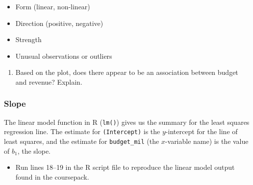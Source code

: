 \documentclass[
]{report}
\providecommand{\tightlist}{%
  \setlength{\itemsep}{0pt}\setlength{\parskip}{0pt}}
\begin{document}
\begin{itemize}
\tightlist
\item
  Form (linear, non-linear)
\end{itemize}

\vspace{.075in}

\begin{itemize}
\tightlist
\item
  Direction (positive, negative)
\end{itemize}

\vspace{.075in}

\begin{itemize}
\tightlist
\item
  Strength
\end{itemize}

\vspace{.075in}

\begin{itemize}
\tightlist
\item
  Unusual observations or outliers
\end{itemize}

\vspace{.075in}

\begin{enumerate}
\def\labelenumi{\arabic{enumi}.}
\setcounter{enumi}{2}
\tightlist
\item
  Based on the plot, does there appear to be an association between budget and revenue? Explain.
\end{enumerate}

\vspace{1in}

\hypertarget{slope}{%
\subsubsection*{Slope}\label{slope}}

The linear model function in R (\texttt{lm()}) gives us the summary for the least squares regression line. The estimate for \texttt{(Intercept)} is the \(y\)-intercept for the line of least squares, and the estimate for \texttt{budget\_mil} (the \(x\)-variable name) is the value of \(b_1\), the slope.

\begin{itemize}
\tightlist
\item
  Run lines 18--19 in the R script file to reproduce the linear model output found in the coursepack.
\end{itemize}
\end{document}
